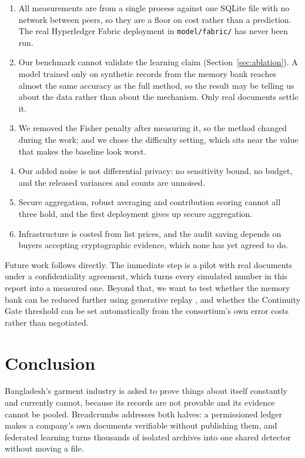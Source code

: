 \documentclass[11pt,a4paper]{article}
\begin{document}
\begin{enumerate}[leftmargin=1.4em,itemsep=0.15em]
commit--reveal round. Before adoption the contract does not require
counter-signatures, and any interface must show that the rule is not in force
rather than imply a guarantee that is switched off.
\item All measurements are from a single process against one SQLite file with no
network between peers, so they are a floor on cost rather than a prediction. The
real Hyperledger Fabric deployment in \texttt{model/fabric/} has never been run.
\item Our benchmark cannot validate the learning claim
(Section~\ref{sec:ablation}). A model trained only on synthetic records from the
memory bank reaches almost the same accuracy as the full method, so the result may
be telling us about the data rather than about the mechanism. Only real documents
settle it.
\item We removed the Fisher penalty after measuring it, so the method changed
during the work; and we chose the difficulty setting, which sits near the value
that makes the baseline look worst.
\item Our added noise is not differential privacy: no sensitivity bound, no
budget, and the released variances and counts are unnoised.
\item Secure aggregation, robust averaging and contribution scoring cannot all
three hold, and the first deployment gives up secure aggregation.
\item Infrastructure is costed from list prices, and the audit saving depends on
buyers accepting cryptographic evidence, which none has yet agreed to do.
\end{enumerate}

Future work follows directly. The immediate step is a pilot with real documents
under a confidentiality agreement, which turns every simulated number in this
report into a measured one. Beyond that, we want to test whether the memory bank
can be reduced further using generative replay \citep{shin2017dgr}, and whether
the Continuity Gate threshold can be set automatically from the consortium's own
error costs rather than negotiated.

\section{Conclusion}

Bangladesh's garment industry is asked to prove things about itself constantly
and currently cannot, because its records are not provable and its evidence
cannot be pooled. Breadcrumbs addresses both halves: a permissioned ledger makes
a company's own documents verifiable without publishing them, and federated
learning turns thousands of isolated archives into one shared detector without
moving a file.
\end{document}
